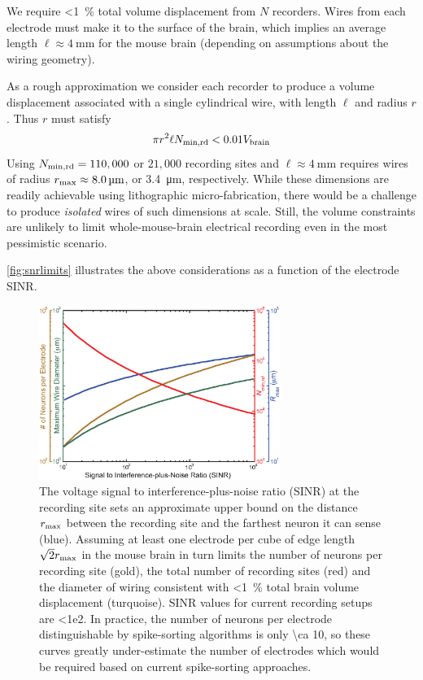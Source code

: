 We require \SI{<1}{\percent} total volume displacement from $N$ recorders.
Wires from each electrode must make it to the surface of the brain, which implies an average length $\ell\approx\SI{4}{\milli\meter}$ for the mouse brain (depending on assumptions about the wiring geometry).

As a rough approximation we consider each recorder to produce a volume displacement associated with a single cylindrical wire, with length $\ell$ and radius $r$.
Thus $r$ must satisfy \[\pi r^2\ell N_{\text{\scriptsize min,rd}} < 0.01V_{\text{\scriptsize brain}}\]
Using $N_{\text{\scriptsize min,rd}} = 110,000$ or $21,000$ recording sites and $\ell\approx\SI{4}{\milli\meter}$ requires wires of radius $r_{\text{\scriptsize max}} \approx \SI{8.0}{\micro\meter}$, or \SI{3.4}{\micro\meter}, respectively.
While these dimensions are readily achievable using lithographic micro-fabrication, there would be a challenge to produce \emph{isolated} wires of such dimensions at scale.
Still, the volume constraints are unlikely to limit whole-mouse-brain electrical recording even in the most pessimistic scenario.

\autoref{fig:snrlimits} illustrates the above considerations as a function of the electrode SINR.

\begin{figure}[htbp]
\caption{
The voltage signal to interference-plus-noise ratio (SINR) at the recording site sets an approximate upper bound on the distance $r_{\text{\scriptsize max}}$ between the recording site and the farthest neuron it can sense (blue).
Assuming at least one electrode per cube of edge length $\sqrt{2}r_{\text{\scriptsize max}}$ in the mouse brain in turn limits the number of neurons per recording site (gold), the total number of recording sites (red) and the diameter of wiring consistent with \SI{<1}{\percent} total brain volume displacement (turquoise).
SINR values for current recording setups are \num{<1e2}.
In practice, the number of neurons per electrode distinguishable by spike-sorting algorithms is only \num{\ca 10}, so these curves greatly under-estimate the number of electrodes which would be required based on current spike-sorting approaches.
}
\label{fig:snrlimits}
\centering
\includegraphics[width=0.7\textwidth]{figs/Fig3.eps}
\end{figure}

